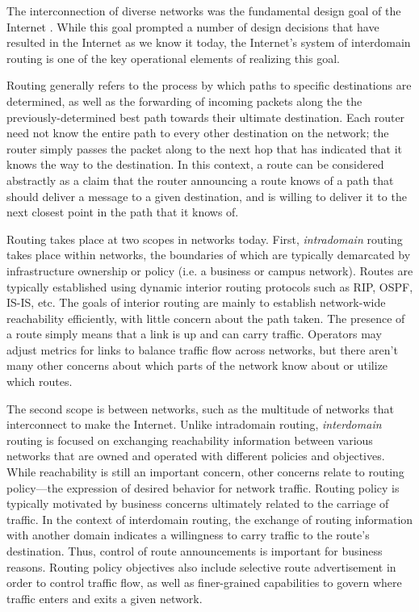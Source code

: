 The interconnection of diverse networks was the fundamental design goal of the Internet \cite{Clark:1988kl}. While this goal prompted a number of design decisions that have resulted in the Internet as we know it today, the Internet's system of interdomain routing is one of the key operational elements of realizing this goal.

Routing generally refers to the process by which paths to specific destinations are determined, as well as the forwarding of incoming packets along the the previously-determined best path towards their ultimate destination. Each router need not know the entire path to every other destination on the network; the router simply passes the packet along to the next hop that has indicated that it knows the way to the destination. In this context, a route can be considered abstractly as a claim that the router announcing a route knows of a path that should deliver a message to a given destination, and is willing to deliver it to the next closest point in the path that it knows of.

Routing takes place at two scopes in networks today. First, \emph{intradomain} routing takes place within networks, the boundaries of which are typically demarcated by infrastructure ownership or policy (i.e. a business or campus network). Routes are typically established using dynamic interior routing protocols such as RIP, OSPF, IS-IS, etc. The goals of interior routing are mainly to establish network-wide reachability efficiently, with little concern about the path taken. The presence of a route simply means that a link is up and can carry traffic. Operators may adjust metrics for links to balance traffic flow across networks, but there aren't many other concerns about which parts of the network know about or utilize which routes.

The second scope is between networks, such as the multitude of networks that interconnect to make the Internet. Unlike intradomain routing, \emph{interdomain} routing is focused on exchanging reachability information between various networks that are owned and operated with different policies and objectives. While reachability is still an important concern, other concerns relate to routing policy---the expression of desired behavior for network traffic. Routing policy is typically motivated by business concerns ultimately related to the carriage of traffic. In the context of interdomain routing, the exchange of routing information with another domain indicates a willingness to carry traffic to the route's destination. Thus, control of route announcements is important for business reasons. Routing policy objectives also include selective route advertisement in order to control traffic flow, as well as finer-grained capabilities to govern where traffic enters and exits a given network.

